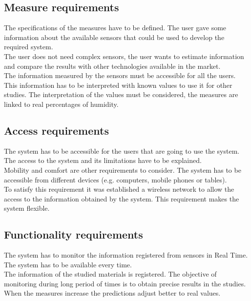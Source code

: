 \subsection{Measure requirements}

The specifications of the measures have to be defined. The user gave some information about the available sensors that could be used to develop the required system.\\

The user does not need complex sensors, the user wants to estimate information and compare the results with other technologies available in the market.\\

The information measured by the sensors must be accessible for all the users. This information has to be interpreted with known values to use it for other studies. The interpretation of the values must be considered, the measures are linked to real percentages of humidity.

\subsection{Access requirements}

The system has to be accessible for the users that are going to use the system. The access to the system and its limitations have to be explained.\\

Mobility and comfort are other requirements to consider. The system has to be accessible from different devices (e.g. computers, mobile phones or tables).\\

To satisfy this requirement it was established a wireless network to allow the access to the information obtained by the system. This requirement makes the system flexible.

\subsection{Functionality requirements}

The system has to monitor the information registered from sensors in Real Time. The system has to be available every time.\\

The information of the studied materials is registered. The objective of monitoring during long period of times is to obtain precise results in the studies. When the measures increase the predictions adjust better to real values.\\

